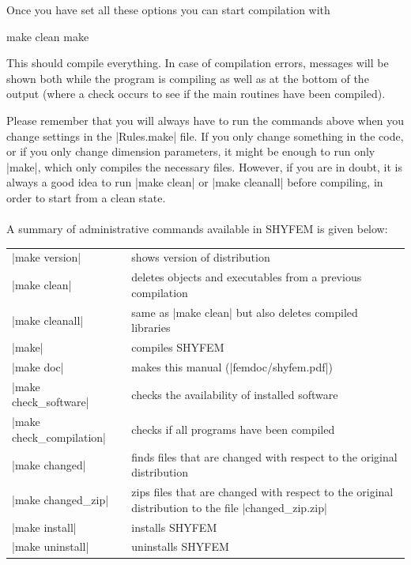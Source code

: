 Once you have set all these options you can start compilation with

\begin{code}
    make clean
    make
\end{code}

This should compile everything. In case of compilation errors,
 messages will be shown both while the program is compiling as
well as at the bottom of the output (where a check occurs to see if
the main routines have been compiled).

Please remember that you will always have to run the commands above
when you change settings in the |Rules.make| file. If you only change
something in the code, or if you only change dimension parameters, it
might be enough to run only |make|, which only compiles the necessary
files. However, if you are in doubt, it is always a good idea to run
|make clean| or |make cleanall| before compiling, in order to start from
a clean state.
\\
\\
A summary of administrative commands available in SHYFEM is given below: \vspace{0.5cm}

\begin{center}
\begin{tabular}{ l p{7cm} }
|make version|		&	shows version of distribution \\
|make clean|		&	deletes objects and executables from a previous
                        	compilation \\
|make cleanall|		&	same as |make clean| but also deletes
				compiled libraries \\
|make|		&	compiles SHYFEM \\
|make doc|		&	makes this manual (|femdoc/shyfem.pdf|) \\
|make check_software|	&	checks the availability of installed software \\
|make check_compilation|&	checks if all programs have been compiled \\
|make changed|		&	finds files that are changed with respect to the
				original distribution \\
|make changed_zip|	&	zips files that are changed with respect to the
				original distribution to the file
				|changed_zip.zip| \\
|make install|		&	installs SHYFEM \\
|make uninstall|	&	uninstalls SHYFEM \\
\end{tabular}
\end{center}

